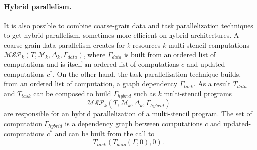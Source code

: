 
\paragraph{Hybrid parallelism.}
It is also possible to combine coarse-grain data and task parallelization techniques to get hybrid parallelism, sometimes more efficient on hybrid architectures. A coarse-grain data parallelism creates for $k$ resources $k$ multi-stencil computations $\mathcal{MSP}_k(T,\mathcal{M}_k,\Delta_k,\Gamma_{data})$, where $\Gamma_{data}$ is built from an ordered list of computations and is itself an ordered list of computations $c$ and updated-computations $c^*$. On the other hand, the task parallelization technique builds, from an ordered list of computation, a graph dependency $\Gamma_{task}$. As a result $T_{data}$ and $T_{task}$ can be composed to build $\Gamma_{hybrid}$ such as $k$ multi-stencil programs
\begin{equation*}
\mathcal{MSP}_k(T,\mathcal{M}_k,\Delta_k,\Gamma_{hybrid})
\end{equation*}
are responsible for an hybrid parallelization of a multi-stencil program. The set of computation $\Gamma_{hybrid}$ is a dependency graph between computations $c$ and updated-computations $c^*$ and can be built from the call to 
\begin{equation*}
T_{task}(T_{data}(\Gamma,0),0).
\end{equation*}
